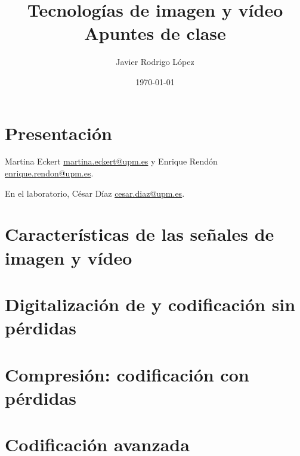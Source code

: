 \documentclass[10pt]{article}
\title{\Huge Tecnologías de imagen y vídeo\\\huge Apuntes de clase}
\author{Javier Rodrigo López}
\date{\today}
\begin{document}
\maketitle

\tableofcontents


\newpage

\chapter{Presentación}

Martina Eckert \href{mailto:martina.eckert@upm.es}{martina.eckert@upm.es}  y Enrique Rendón \href{mailto:enrique.rendon@upm.es}{enrique.rendon@upm.es}.

En el laboratorio, César Díaz \href{mailto:cesar.diaz@upm.es}{cesar.diaz@upm.es}.

\chapter{Características de las señales de imagen y vídeo}

\chapter{Digitalización de y codificación sin pérdidas}

\chapter{Compresión: codificación con pérdidas}

\chapter{Codificación avanzada}
\end{document}
